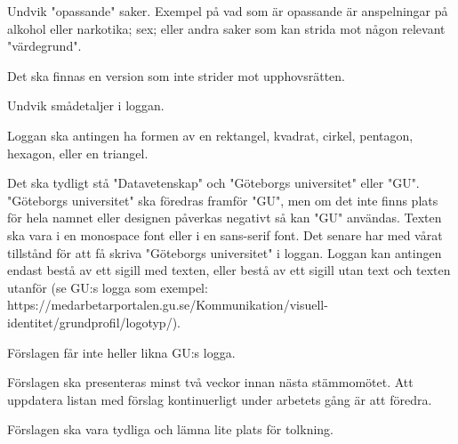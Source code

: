 \documentclass[protokoll]{dvd}
\begin{document}
           \begin{attsatser}
               \item Undvik "opassande" saker. Exempel på vad som är opassande är anspelningar på alkohol eller narkotika; sex; eller andra saker som kan strida mot någon relevant "värdegrund".
               \item Det ska finnas en version som inte strider mot upphovsrätten.
               \item Undvik smådetaljer i loggan.
               \item Loggan ska antingen ha formen av en rektangel, kvadrat, cirkel, pentagon, hexagon, eller en triangel.
               \item Det ska tydligt stå "Datavetenskap" och "Göteborgs universitet" eller "GU". "Göteborgs universitet" ska föredras framför "GU", men om det inte finns plats för hela namnet eller designen påverkas negativt så kan "GU" användas. Texten ska vara i en monospace font eller i en sans-serif font. Det senare har med vårat tillstånd för att få skriva "Göteborgs universitet" i loggan. Loggan kan antingen endast bestå av ett sigill med texten, eller bestå av ett sigill utan text och texten utanför (se GU:s logga som exempel: https://medarbetarportalen.gu.se/Kommunikation/visuell-identitet/grundprofil/logotyp/).
               \item Förslagen får inte heller likna GU:s logga.
               \item Förslagen ska presenteras minst två veckor innan nästa stämmomötet. Att uppdatera listan med förslag kontinuerligt under arbetets gång är att föredra.
               \item Förslagen ska vara tydliga och lämna lite plats för tolkning.
           \end{attsatser}
\end{document}
